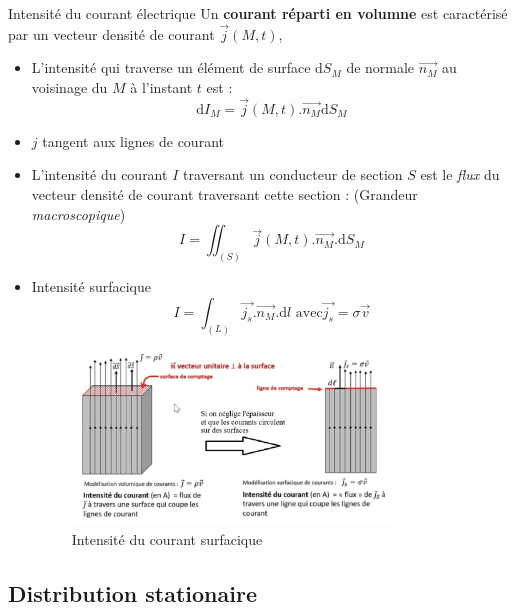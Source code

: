 \begin{Prop}{Intensité du courant électrique}{}
Un \textbf{courant réparti en volumne} est caractérisé par un vecteur densité de courant $\overrightarrow{j}(M,t)$, 
\begin{itemize}

    \item L'intensité qui traverse un élément de surface $\mathrm{d}S_M$ de normale $\overrightarrow{n_M}$ au voisinage du $M$ à l'instant $t$ est :
\[
  \mathrm{d}I_M = \overrightarrow{j}(M,t) . \overrightarrow{n_M} \mathrm{d}S_M
\]
\item $j$ tangent aux lignes de courant
    \item L'intensité du courant $I$ traversant un conducteur de section $S$ est le \textit{flux} du vecteur densité de courant traversant cette section : (Grandeur \textit{macroscopique})
      \[
        I = \iint _ {(S)} \overrightarrow{j}(M,t).\overrightarrow{n_M}. \mathrm{d}S_M
      \]
    \item Intensité surfacique
      \[
        I = \int_{(L)} \overrightarrow{j_s}. \overrightarrow{n_M}.\mathrm{d}l \text{ avec} \overrightarrow{j_s} = \sigma \overrightarrow{v}
      \] 

      \begin{figure}[H] %
        \centering
        \includegraphics[width=0.8\textwidth]{./assets/Intensité du courant surfacique.png}
        \caption{Intensité du courant surfacique}
        \label{Intensité du courant surfacique}
      \end{figure}

      
\end{itemize}
\end{Prop}

\subsection{Distribution stationaire} %
\label{sub:Distribution stationaire}

